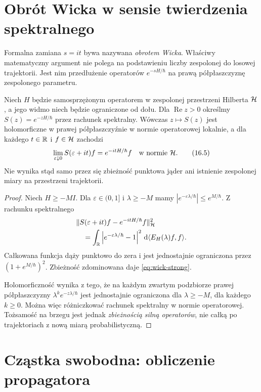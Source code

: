 \section{Obrót Wicka w sensie twierdzenia spektralnego}

Formalna zamiana $s=it$ bywa nazywana \emph{obrotem Wicka}.
Właściwy matematyczny argument nie polega na
podstawieniu liczby zespolonej do losowej trajektorii.
Jest nim przedłużenie operatorów
$e^{-sH/\hbar}$ na prawą półpłaszczyznę
zespolonego parametru.

\begin{twierdzenie}
\label{th:wick-spectral}
Niech $H$ będzie samosprzężonym operatorem w zespolonej
przestrzeni Hilberta $\mathcal{H}$, a jego widmo niech będzie
ograniczone od dołu. Dla $\operatorname{Re}z>0$ określmy
$S(z)=e^{-zH/\hbar}$ przez rachunek spektralny.
Wówczas $z\mapsto S(z)$ jest holomorficzne w prawej
półpłaszczyźnie w normie operatorowej lokalnie, a dla
każdego $t\in\mathbb{R}$ i $f\in\mathcal{H}$ zachodzi
\[
 \lim_{\varepsilon\downarrow0}
  S(\varepsilon+it)f=e^{-itH/\hbar}f
  \quad\text{w normie }\mathcal{H}.
\tag{16.5}\label{eq:wick-strong}
\]
Nie wynika stąd samo przez się zbieżność punktowa jąder
ani istnienie zespolonej miary na przestrzeni trajektorii.
\end{twierdzenie}
\begin{proof}
Niech $H\ge-MI$. Dla $\varepsilon\in(0,1]$ i
$\lambda\ge-M$ mamy $|e^{-\varepsilon\lambda/\hbar}|
\le e^{M/\hbar}$. Z rachunku spektralnego
\[
\begin{split}
&\|S(\varepsilon+it)f-e^{-itH/\hbar}f\|_{\mathcal{H}}^2\\
&\quad=\int_{\mathbb{R}}\left|e^{-\varepsilon\lambda/\hbar}-1\right|^2
 \,\mathrm{d}\langle E_H(\lambda)f,f\rangle.
\end{split}
\]
Całkowana funkcja dąży punktowo do zera i jest
jednostajnie ograniczona przez $(1+e^{M/\hbar})^2$.
Zbieżność zdominowana daje \eqref{eq:wick-strong}.

Holomorficzność wynika z tego, że na każdym zwartym
podzbiorze prawej półpłaszczyzny
$\lambda^k e^{-z\lambda/\hbar}$ jest jednostajnie
ograniczona dla $\lambda\ge-M$, dla każdego $k\ge0$.
Można więc różniczkować rachunek spektralny w normie
operatorowej. Tożsamość na brzegu jest jednak
\emph{zbieżnością silną operatorów}, nie całką po
trajektoriach z nową miarą probabilistyczną.
\end{proof}

\section{Cząstka swobodna: obliczenie propagatora}

